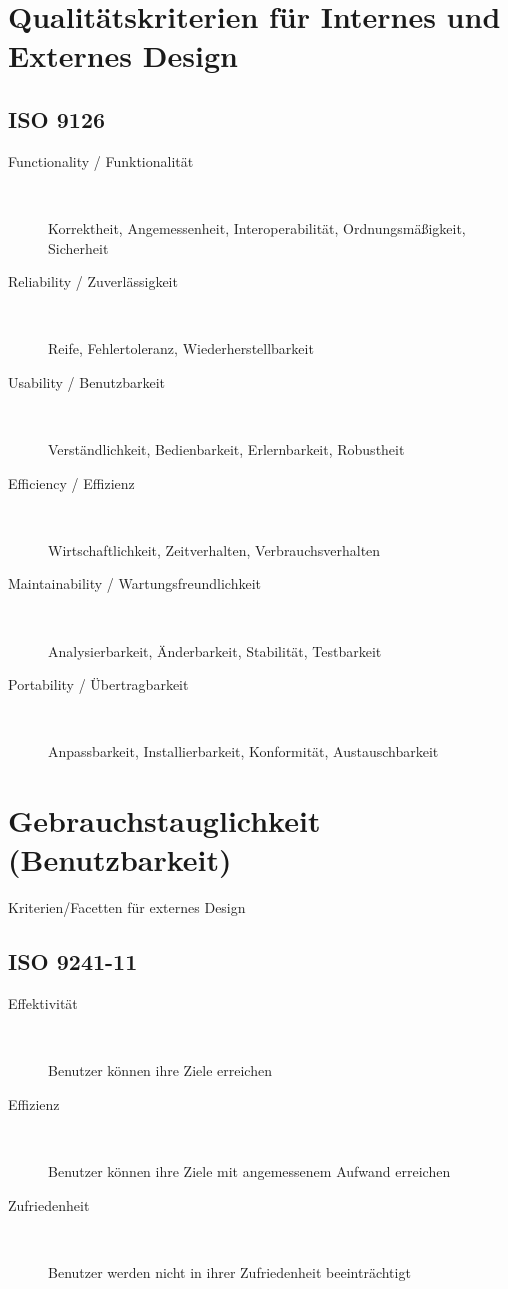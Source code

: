 \documentclass{report}
\begin{document}
\renewcommand{\labelitemi}{$\cdot$}

\section*{Qualitätskriterien für Internes und Externes Design}
\subsection*{ISO 9126}
\begin{description}
\item[Functionality / Funktionalität]~\par

Korrektheit, Angemessenheit, Interoperabilität, Ordnungsmäßigkeit, Sicherheit

\item[Reliability / Zuverlässigkeit]~\par

Reife, Fehlertoleranz, Wiederherstellbarkeit

\item[Usability / Benutzbarkeit]~\par

Verständlichkeit, Bedienbarkeit, Erlernbarkeit, Robustheit

\item[Efficiency / Effizienz]~\par

Wirtschaftlichkeit, Zeitverhalten, Verbrauchsverhalten

\item[Maintainability / Wartungsfreundlichkeit]~\par

Analysierbarkeit, Änderbarkeit, Stabilität, Testbarkeit

\item[Portability / Übertragbarkeit]~\par

Anpassbarkeit, Installierbarkeit, Konformität, Austauschbarkeit
\end{description}

\newpage

\section*{Gebrauchstauglichkeit (Benutzbarkeit)}
Kriterien/Facetten für externes Design
\subsection*{ISO 9241-11}
\begin{description}
\item[Effektivität]~\par
Benutzer können ihre
Ziele erreichen
\item[Effizienz]~\par
Benutzer können ihre
Ziele mit angemessenem
Aufwand erreichen
\item[Zufriedenheit]~\par
Benutzer werden nicht in
ihrer Zufriedenheit
beeinträchtigt
\end{description}
\end{document}
